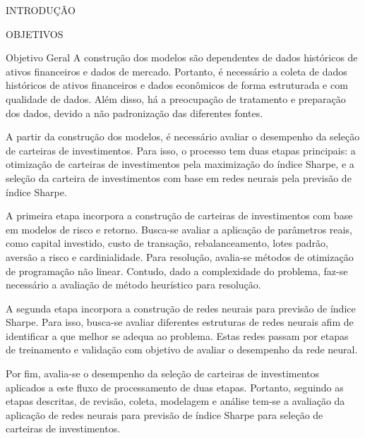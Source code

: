 \begin{section}{INTRODUÇÃO}
\begin{subsection}{OBJETIVOS}
\begin{subsubsection}{Objetivo Geral}
            \ipar A construção dos modelos são dependentes de dados históricos de ativos financeiros e dados de mercado. Portanto, é necessário a coleta de dados históricos de ativos financeiros e dados econômicos de forma estruturada e com qualidade de dados. Além disso, há a preocupação de tratamento e preparação dos dados, devido a não padronização das diferentes fontes.

            \ipar A partir da construção dos modelos, é necessário avaliar o desempenho da seleção de carteiras de investimentos. Para isso, o processo tem duas etapas principais: a otimização de carteiras de investimentos pela maximização do índice Sharpe, e a seleção da carteira de investimentos com base em redes neurais pela previsão de índice Sharpe. 

            \ipar A primeira etapa incorpora a construção de carteiras de investimentos com base em modelos de risco e retorno. Busca-se avaliar a  aplicação de parâmetros reais, como capital investido, custo de transação, rebalanceamento, lotes padrão, aversão a risco e cardinialidade. Para resolução, avalia-se métodos de otimização de programação não linear. Contudo, dado a complexidade do problema, faz-se necessário a avaliação de método heurístico para resolução.

            \ipar A segunda etapa incorpora a construção de redes neurais para previsão de índice Sharpe. Para isso, busca-se avaliar diferentes estruturas de redes neurais afim de identificar a que melhor se adequa ao problema. Estas redes passam por etapas de treinamento e validação com objetivo de avaliar o desempenho da rede neural.

            \ipar Por fim, avalia-se o desempenho da seleção de carteiras de investimentos aplicados a este fluxo de processamento de duas etapas. Portanto, seguindo as etapas descritas, de revisão, coleta, modelagem e análise tem-se a avaliação da aplicação de redes neurais para previsão de índice Sharpe para seleção de carteiras de investimentos.

    
        \end{subsubsection}


\end{subsection}
\end{section}
